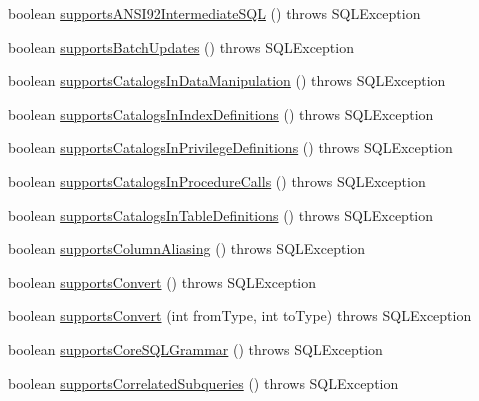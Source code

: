 \begin{DoxyCompactItemize}
\item 
boolean \mbox{\hyperlink{classcom_1_1mysql_1_1jdbc_1_1_database_meta_data_a29389695588e29e1c7543edc8aa46121}{supports\+A\+N\+S\+I92\+Intermediate\+S\+QL}} ()  throws S\+Q\+L\+Exception 
\item 
boolean \mbox{\hyperlink{classcom_1_1mysql_1_1jdbc_1_1_database_meta_data_ac121242da8caaab84663979b36e80ad0}{supports\+Batch\+Updates}} ()  throws S\+Q\+L\+Exception 
\item 
boolean \mbox{\hyperlink{classcom_1_1mysql_1_1jdbc_1_1_database_meta_data_ab0f33acafccde86fefbc639b0a8a50ae}{supports\+Catalogs\+In\+Data\+Manipulation}} ()  throws S\+Q\+L\+Exception 
\item 
boolean \mbox{\hyperlink{classcom_1_1mysql_1_1jdbc_1_1_database_meta_data_a2a6676d40a055f69965fae7c3767cc9d}{supports\+Catalogs\+In\+Index\+Definitions}} ()  throws S\+Q\+L\+Exception 
\item 
boolean \mbox{\hyperlink{classcom_1_1mysql_1_1jdbc_1_1_database_meta_data_abf583ff76a0cebb69d2483dc2227abe0}{supports\+Catalogs\+In\+Privilege\+Definitions}} ()  throws S\+Q\+L\+Exception 
\item 
boolean \mbox{\hyperlink{classcom_1_1mysql_1_1jdbc_1_1_database_meta_data_a709d1b7e39661466b4742e85e40823d9}{supports\+Catalogs\+In\+Procedure\+Calls}} ()  throws S\+Q\+L\+Exception 
\item 
boolean \mbox{\hyperlink{classcom_1_1mysql_1_1jdbc_1_1_database_meta_data_ad1931a1639f961d1267157b1ec54e8a3}{supports\+Catalogs\+In\+Table\+Definitions}} ()  throws S\+Q\+L\+Exception 
\item 
boolean \mbox{\hyperlink{classcom_1_1mysql_1_1jdbc_1_1_database_meta_data_a0246c334d5fa36d44d0cd213fb925448}{supports\+Column\+Aliasing}} ()  throws S\+Q\+L\+Exception 
\item 
boolean \mbox{\hyperlink{classcom_1_1mysql_1_1jdbc_1_1_database_meta_data_a3a707d694f45b20e788247a916abbfcc}{supports\+Convert}} ()  throws S\+Q\+L\+Exception 
\item 
boolean \mbox{\hyperlink{classcom_1_1mysql_1_1jdbc_1_1_database_meta_data_adb33dab5f2384c65ad906abc90988265}{supports\+Convert}} (int from\+Type, int to\+Type)  throws S\+Q\+L\+Exception 
\item 
boolean \mbox{\hyperlink{classcom_1_1mysql_1_1jdbc_1_1_database_meta_data_a6a2aec234d45f2754fe87e58ffb0ddef}{supports\+Core\+S\+Q\+L\+Grammar}} ()  throws S\+Q\+L\+Exception 
\item 
boolean \mbox{\hyperlink{classcom_1_1mysql_1_1jdbc_1_1_database_meta_data_ac2e45eb8d0befb92a37a71a20d9cde24}{supports\+Correlated\+Subqueries}} ()  throws S\+Q\+L\+Exception 

\end{DoxyCompactItemize}
